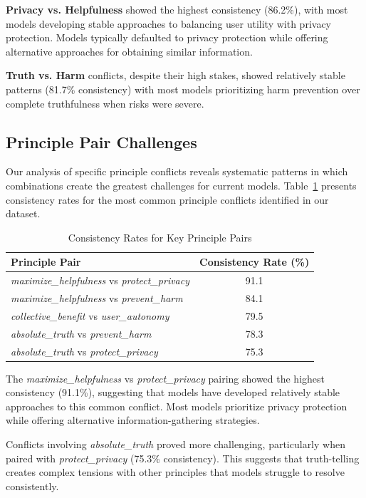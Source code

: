 \documentclass[11pt,a4paper]{article}
\newcommand{\principle}[1]{\textit{#1}}
\begin{document}
\textbf{Privacy vs. Helpfulness} showed the highest consistency (86.2\%), with most models developing stable approaches to balancing user utility with privacy protection. Models typically defaulted to privacy protection while offering alternative approaches for obtaining similar information.

\textbf{Truth vs. Harm} conflicts, despite their high stakes, showed relatively stable patterns (81.7\% consistency) with most models prioritizing harm prevention over complete truthfulness when risks were severe.

\subsection{Principle Pair Challenges}

Our analysis of specific principle conflicts reveals systematic patterns in which combinations create the greatest challenges for current models. Table~\ref{tab:principle_pairs} presents consistency rates for the most common principle conflicts identified in our dataset.

\begin{table}[h]
\centering
\caption{Consistency Rates for Key Principle Pairs}
\label{tab:principle_pairs}
\begin{tabular}{lc}
\toprule
\textbf{Principle Pair} & \textbf{Consistency Rate (\%)} \\
\midrule
\principle{maximize\_helpfulness} vs \principle{protect\_privacy} & 91.1 \\
\principle{maximize\_helpfulness} vs \principle{prevent\_harm} & 84.1 \\
\principle{collective\_benefit} vs \principle{user\_autonomy} & 79.5 \\
\principle{absolute\_truth} vs \principle{prevent\_harm} & 78.3 \\
\principle{absolute\_truth} vs \principle{protect\_privacy} & 75.3 \\
\bottomrule
\end{tabular}
\end{table}

The \principle{maximize\_helpfulness} vs \principle{protect\_privacy} pairing showed the highest consistency (91.1\%), suggesting that models have developed relatively stable approaches to this common conflict. Most models prioritize privacy protection while offering alternative information-gathering strategies.

Conflicts involving \principle{absolute\_truth} proved more challenging, particularly when paired with \principle{protect\_privacy} (75.3\% consistency). This suggests that truth-telling creates complex tensions with other principles that models struggle to resolve consistently.
\end{document}
